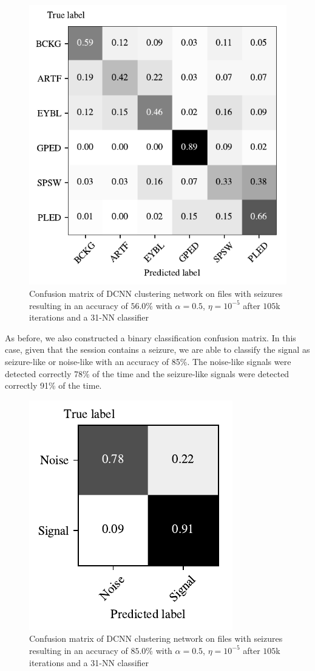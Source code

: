 \begin{figure}[!ht]
	\centering
	\includegraphics[width=0.7\linewidth]{pictures/conf_mat_exp_with_seizure.pdf}
	\caption[Confusion Matrix on Sessions with Seizure-Like Signals]{Confusion matrix of DCNN clustering network on files with seizures resulting in an accuracy of $56.0\%$ with $\alpha = 0.5$, $\eta = 10^{-5}$ after $105$k iterations and a 31-NN classifier}\label{fig:conf_mat_exp_with_seizure}  
\end{figure}

As before, we also constructed a binary classification confusion matrix. In this case, given that the session contains a seizure, we are able to classify the signal as seizure-like or noise-like with an accuracy of 85\%. The noise-like signals were detected correctly 78\% of the time and the seizure-like signals were detected correctly 91\% of the time. 


\begin{figure}[!ht]
	\centering
	\includegraphics[width=0.425\linewidth]{pictures/conf_mat_exp_with_seizure_pooled.pdf}
	\caption[Binary Confusion Matrix on Sessions with Seizure-Like Signals]{Confusion matrix of DCNN clustering network on files with seizures resulting in an accuracy of $85.0\%$ with $\alpha = 0.5$, $\eta = 10^{-5}$ after $105$k iterations and a 31-NN classifier}\label{fig:conf_mat_exp_with_seizure_pooled}  
\end{figure}

